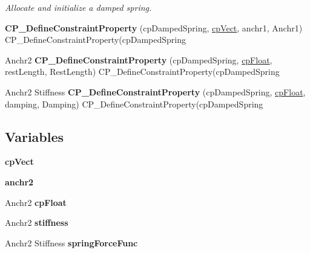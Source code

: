 \begin{DoxyCompactItemize}
\begin{DoxyCompactList}\small\item\em Allocate and initialize a damped spring. \end{DoxyCompactList}\item 
\hypertarget{group__cp_damped_spring_ga90cb7c67e0e3bcd5628797e1323ae2ce}{{\bfseries C\-P\-\_\-\-Define\-Constraint\-Property} (cp\-Damped\-Spring, \hyperlink{structcp_vect}{cp\-Vect}, anchr1, Anchr1) C\-P\-\_\-\-Define\-Constraint\-Property(cp\-Damped\-Spring}\label{group__cp_damped_spring_ga90cb7c67e0e3bcd5628797e1323ae2ce}

\item 
\hypertarget{group__cp_damped_spring_ga81966b1d211a71446c9d3cedd3e20779}{Anchr2 {\bfseries C\-P\-\_\-\-Define\-Constraint\-Property} (cp\-Damped\-Spring, \hyperlink{group__basic_types_gac1ed65573e035bf892505768c852d8d3}{cp\-Float}, rest\-Length, Rest\-Length) C\-P\-\_\-\-Define\-Constraint\-Property(cp\-Damped\-Spring}\label{group__cp_damped_spring_ga81966b1d211a71446c9d3cedd3e20779}

\item 
\hypertarget{group__cp_damped_spring_ga9420bd88d2ba259908431f5f6544546d}{Anchr2 Stiffness {\bfseries C\-P\-\_\-\-Define\-Constraint\-Property} (cp\-Damped\-Spring, \hyperlink{group__basic_types_gac1ed65573e035bf892505768c852d8d3}{cp\-Float}, damping, Damping) C\-P\-\_\-\-Define\-Constraint\-Property(cp\-Damped\-Spring}\label{group__cp_damped_spring_ga9420bd88d2ba259908431f5f6544546d}

\end{DoxyCompactItemize}
\subsection*{Variables}
\begin{DoxyCompactItemize}
\item 
\hypertarget{group__cp_damped_spring_gae5bb48004c89589d2d4b8008db38754e}{{\bfseries cp\-Vect}}\label{group__cp_damped_spring_gae5bb48004c89589d2d4b8008db38754e}

\item 
\hypertarget{group__cp_damped_spring_gaed362236d55092056b72ea837860308b}{{\bfseries anchr2}}\label{group__cp_damped_spring_gaed362236d55092056b72ea837860308b}

\item 
\hypertarget{group__cp_damped_spring_ga5f57e6b0ab08a954e9c313bcb2a59732}{Anchr2 {\bfseries cp\-Float}}\label{group__cp_damped_spring_ga5f57e6b0ab08a954e9c313bcb2a59732}

\item 
\hypertarget{group__cp_damped_spring_ga88a872c6ca3e8c872a32d9e7299b99f0}{Anchr2 {\bfseries stiffness}}\label{group__cp_damped_spring_ga88a872c6ca3e8c872a32d9e7299b99f0}

\item 
\hypertarget{group__cp_damped_spring_gab77e135fe4cc6beffc8fd3cbe657f0c7}{Anchr2 Stiffness {\bfseries spring\-Force\-Func}}\label{group__cp_damped_spring_gab77e135fe4cc6beffc8fd3cbe657f0c7}

\end{DoxyCompactItemize}
